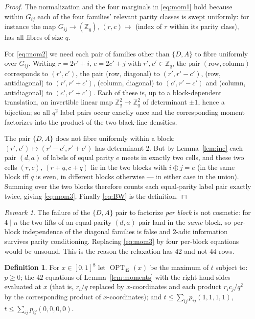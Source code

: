 \documentclass[11pt]{amsart}
\theoremstyle{definition}
\newtheorem{definition}[theorem]{Definition}
\theoremstyle{remark}
\newtheorem{remark}[theorem]{Remark}
\newcommand{\Z}{\mathbb{Z}}
\newcommand{\OPT}{\operatorname{OPT}_{42}}
\begin{document}
\begin{proof}
The normalization and the four marginals in \eqref{eq:mom1} hold because within $G_{ij}$ each of the four families' relevant parity classes is swept uniformly: for instance the map $G_{ij}\to(\Z_q)$, $(r,c)\mapsto$ (index of $r$ within its parity class), has all fibres of size $q$.

For \eqref{eq:mom2} we need each pair of families other than $\{D,A\}$ to fibre uniformly over $G_{ij}$. Writing $r=2r'+i$, $c=2c'+j$ with $r',c'\in\Z_q$, the pair $(\text{row},\text{column})$ corresponds to $(r',c')$, the pair (row, diagonal) to $(r',r'-c')$, (row, antidiagonal) to $(r',r'+c')$, (column, diagonal) to $(c',r'-c')$ and (column, antidiagonal) to $(c',r'+c')$. Each of these is, up to a block-dependent translation, an invertible linear map $\Z_q^2\to\Z_q^2$ of determinant $\pm1$, hence a bijection; so all $q^2$ label pairs occur exactly once and the corresponding moment factorizes into the product of the two black-line densities.

The pair $\{D,A\}$ does not fibre uniformly within a block: $(r',c')\mapsto(r'-c',r'+c')$ has determinant $2$. But by Lemma~\ref{lem:inc} each pair $(d,a)$ of labels of equal parity $e$ meets in exactly two cells, and these two cells $(r,c)$, $(r+q,c+q)$ lie in the two blocks with $i\oplus j=e$ (in the same block iff $q$ is even, in different blocks otherwise --- in either case in the union). Summing over the two blocks therefore counts each equal-parity label pair exactly twice, giving \eqref{eq:mom3}. Finally \eqref{eq:BW} is the definition.
\end{proof}

\begin{remark}
The failure of the $\{D,A\}$ pair to factorize \emph{per block} is not cosmetic: for $4\mid n$ the two lifts of an equal-parity $(d,a)$ pair land in the \emph{same} block, so per-block independence of the diagonal families is false and $2$-adic information survives parity conditioning. Replacing \eqref{eq:mom3} by four per-block equations would be unsound. This is the reason the relaxation has $42$ and not $44$ rows.
\end{remark}

\begin{definition}\label{def:OPT}
For $x\in[0,1]^8$ let $\OPT(x)$ be the maximum of $t$ subject to: $p\ge0$; the $42$ equations of Lemma~\ref{lem:moments} with the right-hand sides evaluated at $x$ (that is, $r_i/q$ replaced by $x$-coordinates and each product $r_ic_j/q^2$ by the corresponding product of $x$-coordinates); and $t\le\sum_{ij}p_{ij}(1,1,1,1)$, $t\le\sum_{ij}p_{ij}(0,0,0,0)$.
\end{definition}
\end{document}
